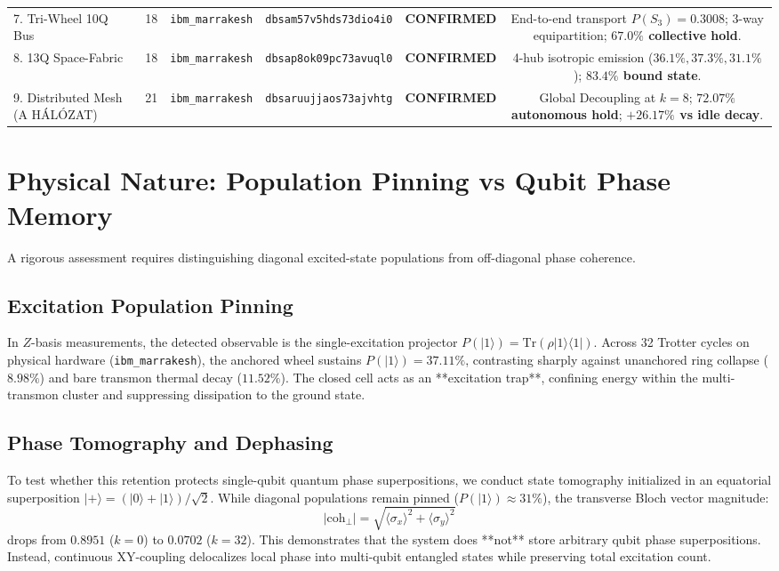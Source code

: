 \documentclass[aps,pra,twocolumn,superscriptaddress,floatfix,10pt]{revtex4-2}
\begin{document}
\begin{table}[t]
\begin{ruledtabular}
\begin{tabular}{lccccc}
7. Tri-Wheel 10Q Bus & 18 & \texttt{ibm\_marrakesh} & \texttt{dbsam57v5hds73dio4i0} & \textbf{CONFIRMED} & End-to-end transport $P(S_3)=0.3008$; 3-way equipartition; \textbf{$67.0\%$ collective hold}. \\
8. 13Q Space-Fabric & 18 & \texttt{ibm\_marrakesh} & \texttt{dbsap8ok09pc73avuql0} & \textbf{CONFIRMED} & 4-hub isotropic emission ($36.1\%, 37.3\%, 31.1\%$); \textbf{$83.4\%$ bound state}. \\
9. Distributed Mesh (A HÁLÓZAT) & 21 & \texttt{ibm\_marrakesh} & \texttt{dbsaruujjaos73ajvhtg} & \textbf{CONFIRMED} & Global Decoupling at $k=8$; \textbf{$72.07\%$ autonomous hold}; \textbf{$+26.17\%$ vs idle decay}. \\
\end{tabular}
\end{ruledtabular}
\end{table}

\section{Physical Nature: Population Pinning vs Qubit Phase Memory}
A rigorous assessment requires distinguishing diagonal excited-state populations from off-diagonal phase coherence.

\subsection{Excitation Population Pinning}
In $Z$-basis measurements, the detected observable is the single-excitation projector $P(|1\rangle) = \text{Tr}(\rho |1\rangle\langle 1|)$. Across 32 Trotter cycles on physical hardware (\texttt{ibm\_marrakesh}), the anchored wheel sustains $P(|1\rangle) = 37.11\%$, contrasting sharply against unanchored ring collapse ($8.98\%$) and bare transmon thermal decay ($11.52\%$). The closed cell acts as an **excitation trap**, confining energy within the multi-transmon cluster and suppressing dissipation to the ground state.

\subsection{Phase Tomography and Dephasing}
To test whether this retention protects single-qubit quantum phase superpositions, we conduct state tomography initialized in an equatorial superposition $|+\rangle = (|0\rangle+|1\rangle)/\sqrt{2}$. While diagonal populations remain pinned ($P(|1\rangle) \approx 31\%$), the transverse Bloch vector magnitude:
\begin{equation}
|\text{coh}_\perp| = \sqrt{\langle\sigma_x\rangle^2 + \langle\sigma_y\rangle^2}
\end{equation}
drops from $0.8951$ ($k=0$) to $0.0702$ ($k=32$). This demonstrates that the system does **not** store arbitrary qubit phase superpositions. Instead, continuous XY-coupling delocalizes local phase into multi-qubit entangled states while preserving total excitation count.
\end{document}
